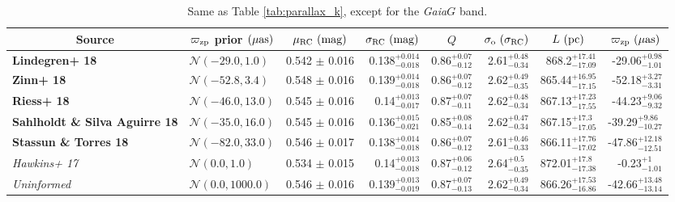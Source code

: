 \documentclass[fleqn,usenatbib]{mnras}
\newcommand{\gaia}{\emph{Gaia}\xspace}
\begin{document}
\begin{table}
    \begin{tabular}{llrrrrrr}
    \toprule
    \multicolumn{1}{c}{Source} &  \multicolumn{1}{c}{$\varpi_{\rm zp}$ prior $(\mu \rm as)$} & \multicolumn{1}{c}{$\mu_{\rm RC}\ (\rm mag)$} & \multicolumn{1}{c}{$\sigma_{\rm RC}\ (\rm mag)$}  & \multicolumn{1}{c}{$Q$} &  \multicolumn{1}{c}{$\sigma_{\rm o}\ (\sigma_{\rm RC})$} & \multicolumn{1}{c}{$L\ (\rm pc)$} & \multicolumn{1}{c}{$\varpi_{\rm zp}\ (\mu \rm as)$} \\
    \midrule
      \textbf{Lindegren+ 18 }                     &  $\mathcal{N}(-29.0 , 1.0)  $ &  0.542 $\pm$ 0.016 &  0.138$_{-0.018}^{+0.014}$ &  0.86$_{-0.12}^{+0.07}$ &  2.61$_{-0.34}^{+0.48}$ &   868.2$_{-17.09}^{+17.41}$ & -29.06$_{- 1.01}^{+ 0.98}$ \\
      \textbf{Zinn+ 18      }                     &  $\mathcal{N}(-52.8 , 3.4)  $ &  0.548 $\pm$ 0.016 &  0.139$_{-0.018}^{+0.014}$ &  0.86$_{-0.12}^{+0.07}$ &  2.62$_{-0.35}^{+0.49}$ &  865.44$_{-17.15}^{+16.95}$ & -52.18$_{- 3.31}^{+ 3.27}$ \\
      \textbf{Riess+ 18     }                     &  $\mathcal{N}(-46.0 , 13.0) $ &  0.545 $\pm$ 0.016 &   0.14$_{-0.017}^{+0.013}$ &  0.87$_{-0.11}^{+0.07}$ &  2.62$_{-0.34}^{+0.48}$ &  867.13$_{-17.55}^{+17.23}$ & -44.23$_{- 9.32}^{+ 9.06}$ \\
      \textbf{Sahlholdt \& Silva Aguirre 18 }    &  $\mathcal{N}(-35.0 , 16.0) $  &  0.545 $\pm$ 0.016 &  0.136$_{-0.021}^{+0.015}$ &  0.85$_{-0.14}^{+0.08}$ &  2.62$_{-0.34}^{+0.47}$ &  867.15$_{-17.05}^{+ 17.3}$ & -39.29$_{-10.27}^{+ 9.86}$ \\
      \textbf{Stassun \& Torres 18   }           &  $\mathcal{N}(-82.0 , 33.0) $  &  0.546 $\pm$ 0.017 &  0.138$_{-0.018}^{+0.014}$ &  0.86$_{-0.12}^{+0.07}$ &  2.61$_{-0.33}^{+0.46}$ &  866.11$_{-17.02}^{+17.76}$ & -47.86$_{-12.51}^{+12.18}$ \\
      \textit{Hawkins+ 17   }                     &  $\mathcal{N}(0.0 , 1.0)    $ &  0.534 $\pm$ 0.015 &   0.14$_{-0.018}^{+0.013}$ &  0.87$_{-0.12}^{+0.06}$ &  2.64$_{-0.35}^{+ 0.5}$ &  872.01$_{-17.38}^{+ 17.8}$ &  -0.23$_{- 1.01}^{+    1}$ \\
      \textit{Uninformed}                     &  $\mathcal{N}(0.0 , 1000.0) $     &  0.546 $\pm$ 0.016 &  0.139$_{-0.019}^{+0.013}$ &  0.87$_{-0.13}^{+0.07}$ &  2.62$_{-0.34}^{+0.49}$ &  866.26$_{-16.86}^{+17.53}$ & -42.66$_{-13.14}^{+13.48}$ \\
    \bottomrule
    \end{tabular}
\caption{Same as Table \ref{tab:parallax_k}, except for the \gaia $G$ band.}
\label{tab:parallax_g}
\end{table}
\end{document}
